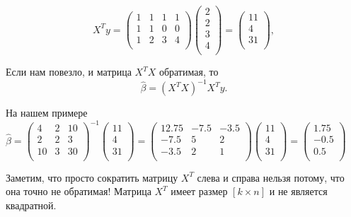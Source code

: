 \documentclass[12pt]{article}
\newcommand{\hb}{\hat{\beta}}
\begin{document}
\[
X^Ty = \begin{pmatrix}
    1 & 1 & 1 & 1 \\
    1 & 1 & 0 & 0 \\
    1 & 2 & 3 & 4\\
\end{pmatrix}
\begin{pmatrix}
    2 \\
    2 \\
    3 \\
    4 \\
\end{pmatrix}=
\begin{pmatrix}
    11 \\
    4 \\
    31 \\
\end{pmatrix},
\]

Если нам повезло, и матрица $X^TX$ обратимая, то 
\[
\hb = (X^TX)^{-1} X^Ty.
\]

На нашем примере $\hb = \begin{pmatrix}
    4 & 2 & 10 \\
    2 & 2 & 3 \\
    10 & 3 & 30 \\
\end{pmatrix}^{-1}
\begin{pmatrix}
    11 \\
    4 \\
    31 \\
\end{pmatrix}= 
\begin{pmatrix}
    12.75 & -7.5 & -3.5 \\
    -7.5 & 5 & 2 \\
    -3.5 & 2 & 1 \\
\end{pmatrix}
\begin{pmatrix}
    11 \\
    4 \\
    31 \\
\end{pmatrix} =
\begin{pmatrix}
    1.75 \\
    -0.5\\
    0.5 \\
\end{pmatrix} 
$

Заметим, что просто сократить матрицу $X^T$ слева и справа нельзя потому, что она точно не обратимая! 
Матрица $X^T$ имеет размер $[k \times n]$ и не является квадратной.
\end{document}
